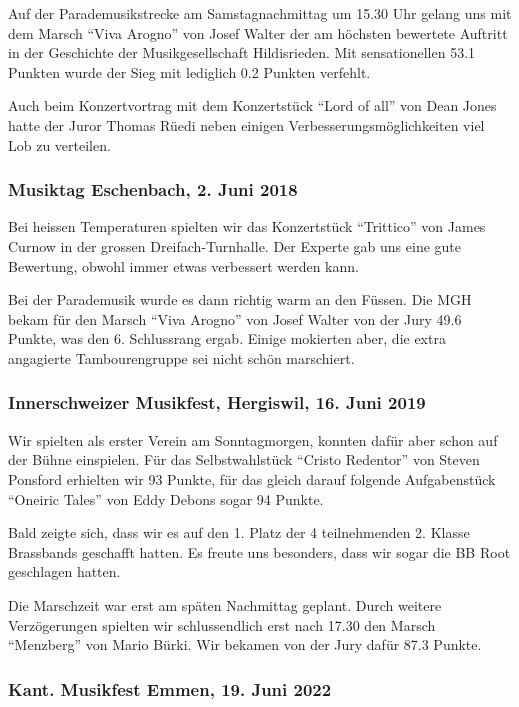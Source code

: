 \begin{history}
    Auf der Parademusikstrecke am Samstagnachmittag um 15.30 Uhr gelang uns mit
    dem Marsch \enquote{Viva Arogno} von Josef Walter der am höchsten bewertete
    Auftritt in der Geschichte der Musikgesellschaft Hildisrieden. Mit
    sensationellen 53.1 Punkten wurde der Sieg mit lediglich 0.2 Punkten
    verfehlt.

    Auch beim Konzertvortrag mit dem Konzertstück \enquote{Lord of all} von Dean
    Jones hatte der Juror Thomas Rüedi neben einigen Verbesserungsmöglichkeiten
    viel Lob zu verteilen.


    \subsubsection*{Musiktag Eschenbach, 2. Juni 2018}

    Bei heissen Temperaturen spielten wir das Konzertstück  \enquote{Trittico}
    von James Curnow in der grossen Dreifach-Turnhalle. Der Experte gab uns eine
    gute Bewertung, obwohl immer etwas verbessert werden kann.

    Bei der Parademusik wurde es dann richtig warm an den Füssen. Die MGH bekam
    für den Marsch \enquote{Viva Arogno} von Josef Walter von der Jury 49.6
    Punkte, was den 6. Schlussrang ergab. Einige mokierten aber, die extra
    angagierte Tambourengruppe sei nicht schön marschiert.


    \subsubsection*{Innerschweizer Musikfest, Hergiswil, 16. Juni 2019}

    Wir spielten als erster Verein am Sonntagmorgen, konnten dafür aber schon
    auf der Bühne einspielen. Für das Selbstwahlstück \enquote{Cristo Redentor}
    von Steven Ponsford erhielten wir 93 Punkte, für das gleich darauf folgende
    Aufgabenstück \enquote{Oneiric Tales} von Eddy Debons sogar 94 Punkte.

    Bald zeigte sich, dass wir es auf den 1. Platz der 4 teilnehmenden 2. Klasse
    Brassbands geschafft hatten. Es freute uns besonders, dass wir sogar die BB
    Root geschlagen hatten.

    Die Marschzeit war erst am späten Nachmittag geplant. Durch weitere
    Verzögerungen spielten wir schlussendlich erst nach 17.30 den Marsch
    \enquote{Menzberg} von Mario Bürki. Wir bekamen von der Jury dafür 87.3
    Punkte.

    \subsubsection*{Kant. Musikfest Emmen, 19. Juni 2022}


\end{history}
